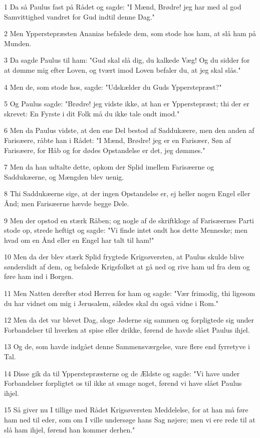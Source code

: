 \par 1 Da så Paulus fast på Rådet og sagde: "I Mænd, Brødre! jeg har med al god Samvittighed vandret for Gud indtil denne Dag."
\par 2 Men Ypperstepræsten Ananias befalede dem, som stode hos ham, at slå ham på Munden.
\par 3 Da sagde Paulus til ham: "Gud skal slå dig, du kalkede Væg! Og du sidder for at dømme mig efter Loven, og tvært imod Loven befaler du, at jeg skal slås."
\par 4 Men de, som stode hos, sagde: "Udskælder du Guds Ypperstepræst?"
\par 5 Og Paulus sagde: "Brødre! jeg vidste ikke, at han er Ypperstepræst; thi der er skrevet: En Fyrste i dit Folk må du ikke tale ondt imod."
\par 6 Men da Paulus vidste, at den ene Del bestod af Saddukæere, men den anden af Farisæere, råbte han i Rådet: "I Mænd, Brødre! jeg er en Farisæer, Søn af Farisæere, for Håb og for dødes Opstandelse er det, jeg dømmes."
\par 7 Men da han udtalte dette, opkom der Splid imellem Farisæerne og Saddukæerne, og Mængden blev uenig.
\par 8 Thi Saddukæerne sige, at der ingen Opstandelse er, ej heller nogen Engel eller Ånd; men Farisæerne hævde begge Dele.
\par 9 Men der opstod en stærk Råben; og nogle af de skriftkloge af Farisæernes Parti stode op, strede heftigt og sagde: "Vi finde intet ondt hos dette Menneske; men hvad om en Ånd eller en Engel har talt til ham!"
\par 10 Men da der blev stærk Splid frygtede Krigsøversten, at Paulus skulde blive sønderslidt af dem, og befalede Krigsfolket at gå ned og rive ham ud fra dem og føre ham ind i Borgen.
\par 11 Men Natten derefter stod Herren for ham og sagde: "Vær frimodig, thi ligesom du har vidnet om mig i Jerusalem, således skal du også vidne i Rom."
\par 12 Men da det var blevet Dag, sloge Jøderne sig sammen og forpligtede sig under Forbandelser til hverken at spise eller drikke, førend de havde slået Paulus ihjel.
\par 13 Og de, som havde indgået denne Sammensværgelse, vare flere end fyrretyve i Tal.
\par 14 Disse gik da til Ypperstepræsterne og de Ældste og sagde: "Vi have under Forbandelser forpligtet os til ikke at smage noget, førend vi have slået Paulus ihjel.
\par 15 Så giver nu I tillige med Rådet Krigsøversten Meddelelse, for at han må føre ham ned til eder, som om I ville undersøge hans Sag nøjere; men vi ere rede til at slå ham ihjel, førend han kommer derhen."

